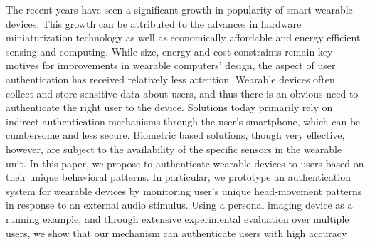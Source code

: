 The recent years have seen a significant growth in popularity of
smart wearable devices. This growth can be attributed to the advances in
hardware miniaturization technology as well as economically affordable
and energy efficient sensing and computing. While size, energy and cost
constraints remain key motives for improvements in wearable computers'
design, the aspect of user authentication has received relatively less
attention. Wearable devices often collect and store sensitive data about
users, and thus there is an obvious need to authenticate the right user to the
device. Solutions today primarily rely on indirect authentication
mechanisms through the user's smartphone, which can be cumbersome and less
secure. Biometric based solutions, though very effective, however, are subject
to the availability of the specific sensors in the wearable unit. In this
paper, we propose to authenticate wearable devices to users based on their
unique behavioral patterns. In particular, we prototype an authentication
system for wearable devices by monitoring user's unique head-movement patterns
in response to an external audio stimulus. Using a personal imaging device as
a running example, and through extensive experimental evaluation over multiple
users, we show that our mechanism can authenticate users with high accuracy


\fi 